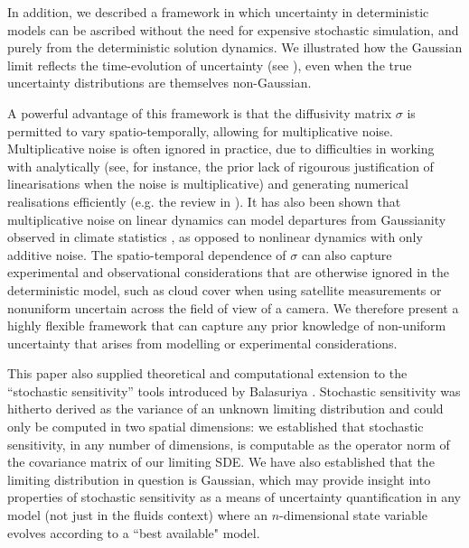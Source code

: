 In addition, we described a framework in which uncertainty in deterministic models can be ascribed without the need for expensive stochastic simulation, and purely from the deterministic solution dynamics.
We illustrated how the Gaussian limit reflects the time-evolution of uncertainty (see ), even when the true uncertainty distributions are themselves non-Gaussian.

A powerful advantage of this framework is that the diffusivity matrix \(\sigma\) is permitted to vary spatio-temporally, allowing for multiplicative noise.
Multiplicative noise is often ignored in practice, due to difficulties in working with analytically (see, for instance, the prior lack of rigourous justification of linearisations when the noise is multiplicative) and generating numerical realisations efficiently (e.g. the review in \cite{MoraEtAl_2017_StableNumericalScheme}).
It has also been shown that multiplicative noise on linear dynamics can model departures from Gaussianity observed in climate statistics \cite{SuraEtAl_2005_MultiplicativeNoiseNonGaussianity}, as opposed to nonlinear dynamics with only additive noise.
The spatio-temporal dependence of \(\sigma\) can also capture experimental and observational considerations that are otherwise ignored in the deterministic model, such as cloud cover when using satellite measurements or nonuniform uncertain across the field of view of a camera.
We therefore present a highly flexible framework that can capture any prior knowledge of non-uniform uncertainty that arises from modelling or experimental considerations.

This paper also supplied theoretical and computational extension to the ``stochastic sensitivity'' tools introduced by Balasuriya \cite{Balasuriya_2020_StochasticSensitivityComputable}.
Stochastic sensitivity was hitherto derived as the variance of an unknown limiting distribution and could only be computed in two spatial dimensions: we established that stochastic sensitivity, in any number of dimensions, is computable as the operator norm of the covariance matrix of our limiting SDE.
We have also established that the limiting distribution in question is Gaussian, which may provide insight into properties of stochastic sensitivity as a means of uncertainty quantification in any model (not just in the fluids context) where an $ n $-dimensional state variable evolves according to a ``best available" model.

